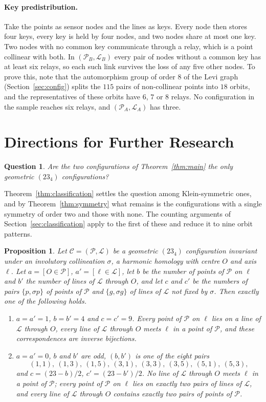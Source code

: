 \documentclass[11pt]{article}
\theoremstyle{plain}
\newtheorem{proposition}[theorem]{Proposition}
\newtheorem{question}{Question}
\theoremstyle{definition}
\newcommand{\cP}{\mathcal{P}}
\newcommand{\cL}{\mathcal{L}}
\newcommand{\cC}{\mathcal{C}}
\begin{document}
\paragraph{Key predistribution.}  Take the points as sensor nodes and the lines as keys.  Every node then stores four keys, every key is held by four nodes, and two nodes share at most one key.  Two nodes with no common key communicate through a relay, which is a point collinear with both.  In $(\cP_B,\cL_B)$ every pair of nodes without a common key has at least six relays, so each such link survives the loss of any five other nodes.  To prove this, note that the automorphism group of order $8$ of the Levi graph (Section~\ref{sec:config}) splits the $115$ pairs of non-collinear points into $18$ orbits, and the representatives of these orbits have $6$, $7$ or $8$ relays.  No configuration in the sample reaches six relays, and $(\cP_A,\cL_A)$ has three.

\section{Directions for Further Research}\label{sec:remarks}

\begin{question}\label{q:all}
Are the two configurations of Theorem~\ref{thm:main} the only geometric $(23_4)$ configurations?
\end{question}

Theorem~\ref{thm:classification} settles the question among Klein-symmetric ones, and by Theorem~\ref{thm:symmetry} what remains is the configurations with a single symmetry of order two and those with none.  The counting arguments of Section~\ref{sec:classification} apply to the first of these and reduce it to nine orbit patterns.

\begin{proposition}\label{prop:involution}
Let $\cC=(\cP,\cL)$ be a geometric $(23_4)$ configuration invariant under an involutory collineation $\sigma$, a harmonic homology with centre $O$ and axis $\ell$.  Let $a=[O\in\cP]$, $a'=[\ell\in\cL]$, let $b$ be the number of points of $\cP$ on $\ell$ and $b'$ the number of lines of $\cL$ through $O$, and let $c$ and $c'$ be the numbers of pairs $\{p,\sigma p\}$ of points of $\cP$ and $\{g,\sigma g\}$ of lines of $\cL$ not fixed by $\sigma$.  Then exactly one of the following holds.
\begin{enumerate}
\item[(a)] $a=a'=1$, $b=b'=4$ and $c=c'=9$.  Every point of $\cP$ on $\ell$ lies on a line of $\cL$ through $O$, every line of $\cL$ through $O$ meets $\ell$ in a point of $\cP$, and these correspondences are inverse bijections.
\item[(b)] $a=a'=0$, $b$ and $b'$ are odd, $(b,b')$ is one of the eight pairs
\[
(1,1),\ (1,3),\ (1,5),\ (3,1),\ (3,3),\ (3,5),\ (5,1),\ (5,3),
\]
and $c=(23-b)/2$, $c'=(23-b')/2$.  No line of $\cL$ through $O$ meets $\ell$ in a point of $\cP$; every point of $\cP$ on $\ell$ lies on exactly two pairs of lines of $\cL$, and every line of $\cL$ through $O$ contains exactly two pairs of points of $\cP$.
\end{enumerate}
\end{proposition}
\end{document}
